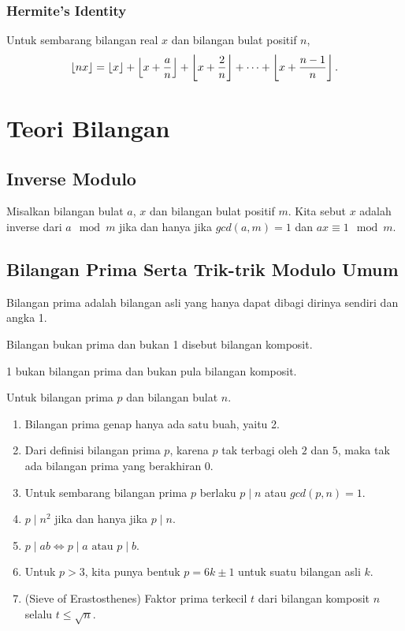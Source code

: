     \subsubsection{Hermite's Identity}
    Untuk sembarang bilangan real $x$ dan bilangan bulat positif $n$,
    $$\left\lfloor nx \right\rfloor=\left\lfloor x \right\rfloor+\left\lfloor x+\dfrac{a}{n} \right\rfloor+\left\lfloor x+\dfrac{2}{n} \right\rfloor+\dots+\left\lfloor x+\dfrac{n-1}{n} \right\rfloor.$$

    
    \section{Teori Bilangan}
    \subsection{Inverse Modulo}
    Misalkan bilangan bulat $a$, $x$ dan bilangan bulat positif $m$. Kita sebut $x$ adalah inverse dari $a \mod m$ jika dan hanya jika $gcd(a,m)=1$ dan $ax \equiv 1 \mod m$.
    
    \subsection{Bilangan Prima Serta Trik-trik Modulo Umum}
    Bilangan prima adalah bilangan asli yang hanya dapat dibagi dirinya sendiri dan angka 1. 
    
    Bilangan bukan prima dan bukan 1 disebut bilangan komposit.
    
    1 bukan bilangan prima dan bukan pula bilangan komposit. 
    
    Untuk bilangan prima $p$ dan bilangan bulat $n$.
    \begin{enumerate}
        \item Bilangan prima genap hanya ada satu buah, yaitu 2.
        \item Dari definisi bilangan prima $p$, karena $p$ tak terbagi oleh $2$ dan $5$, maka tak ada bilangan prima yang berakhiran $0$.
        \item Untuk sembarang bilangan prima $p$ berlaku $p \mid n$ atau $gcd(p,n)=1$.
        \item $p \mid n^2$ jika dan hanya jika $p \mid n$.
        \item $p \mid ab \iff p \mid a \text{ atau } p \mid b$.
        \item Untuk $p > 3$, kita punya bentuk $p = 6k \pm 1$ untuk suatu bilangan asli $k$.
        \item (Sieve of Erastosthenes) 
        Faktor prima terkecil $t$ dari bilangan komposit $n$ selalu $t \le \sqrt{n}$.
        \end{enumerate}
        
